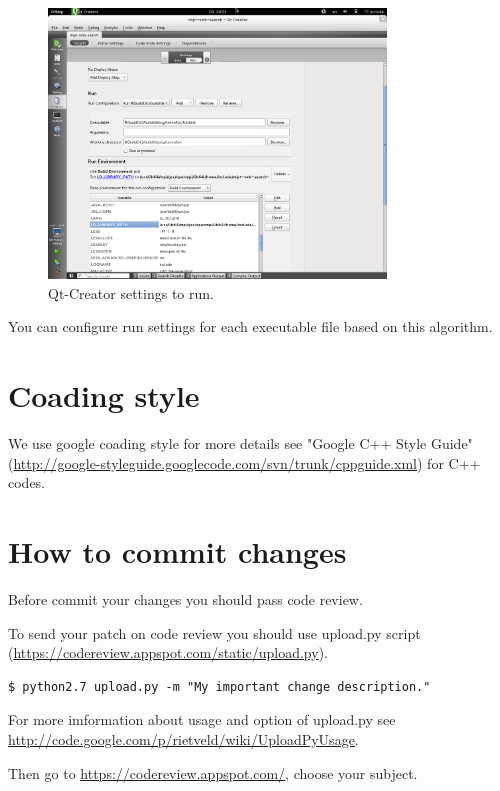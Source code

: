 \documentclass[11pt, oneside, a4paper]{scrartcl}
\begin{document}
\begin{figure}[ht]
  \centering
  \includegraphics[width=0.8\textwidth]{./qt-creator-config-run.png}
  \caption{Qt-Creator settings to run.}
  \label{fig:qt-creator-config-run}
\end{figure}

You can configure run settings for each executable file based on this algorithm.

\section{Coading style}

We use google coading style for more details see "Google C++ Style Guide" (\url{http://google-styleguide.googlecode.com/svn/trunk/cppguide.xml}) for C++ codes.

\section{How to commit changes}

Before commit your changes you should pass code review.

To send your patch on code review you should use upload.py script (\url{https://codereview.appspot.com/static/upload.py}).

\begin{lstlisting}
$ python2.7 upload.py -m "My important change description."
\end{lstlisting}

For more imformation about usage and option of upload.py see \url{http://code.google.com/p/rietveld/wiki/UploadPyUsage}.

Then go to \url{https://codereview.appspot.com/}, choose your subject.
\end{document}
